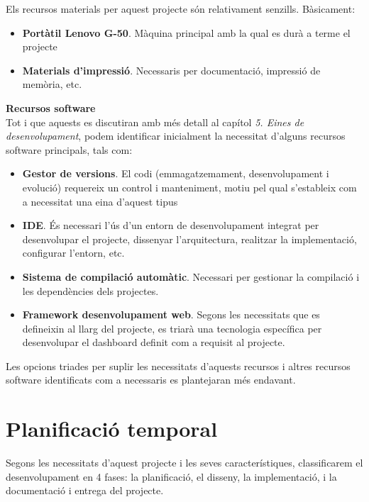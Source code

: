 \noindent Els recursos materials per aquest projecte són relativament senzills. Bàsicament:

\begin{itemize}
\item \textbf{Portàtil Lenovo G-50}. Màquina principal amb la qual es durà a terme el projecte
\item \textbf{Materials d'impressió}. Necessaris per documentació, impressió de memòria, etc.
\end{itemize}

\noindent \textbf{\large Recursos software}\\

\noindent Tot i que aquests es discutiran amb més detall al capítol \textit{5. Eines de desenvolupament}, podem identificar inicialment la necessitat d'alguns recursos software principals, tals com:

\begin{itemize}
\item \textbf{Gestor de versions}. El codi (emmagatzemament, desenvolupament i evolució) requereix un control i manteniment, motiu pel qual s'estableix com a necessitat una eina d'aquest tipus
\item \textbf{IDE}. És necessari l'ús d'un entorn de desenvolupament integrat per desenvolupar el projecte, dissenyar l'arquitectura, realitzar la implementació, configurar l'entorn, etc.
\item \textbf{Sistema de compilació automàtic}. Necessari per gestionar la compilació i les dependències dels projectes.
\item \textbf{Framework desenvolupament web}. Segons les necessitats que es defineixin al llarg del projecte, es triarà una tecnologia específica per desenvolupar el dashboard definit com a requisit al projecte.
\end{itemize}

Les opcions triades per suplir les necessitats d'aquests recursos i altres recursos software identificats com a necessaris es plantejaran més endavant.

\section{Planificació temporal}

Segons les necessitats d’aquest projecte i les seves característiques, classificarem el desenvolupament en 4 fases: la planificació, el disseny, la implementació, i la documentació i entrega del projecte. 

